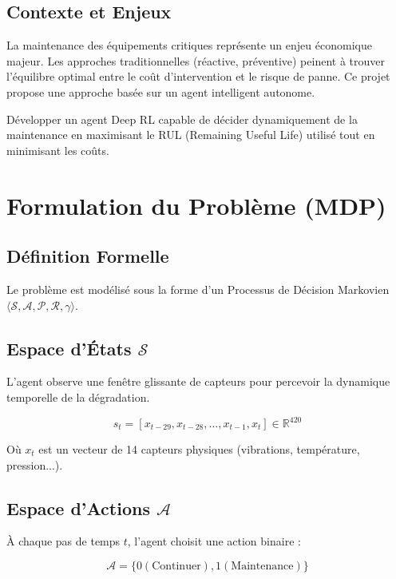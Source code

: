 \documentclass[11pt,a4paper]{report}
\begin{document}
\section{Contexte et Enjeux}
La maintenance des équipements critiques représente un enjeu économique majeur. Les approches traditionnelles (réactive, préventive) peinent à trouver l'équilibre optimal entre le coût d'intervention et le risque de panne.
Ce projet propose une approche basée sur un agent intelligent autonome.

\begin{infobox}
Développer un agent Deep RL capable de décider dynamiquement de la maintenance en maximisant le RUL (Remaining Useful Life) utilisé tout en minimisant les coûts.
\end{infobox}

\chapter{Formulation du Problème (MDP)}

\section{Définition Formelle}
Le problème est modélisé sous la forme d'un Processus de Décision Markovien $ \langle \mathcal{S}, \mathcal{A}, \mathcal{P}, \mathcal{R}, \gamma \rangle $.

\section{Espace d'États $\mathcal{S}$}
L'agent observe une fenêtre glissante de capteurs pour percevoir la dynamique temporelle de la dégradation.
\begin{eqbox}
\[ s_t = [x_{t-29}, x_{t-28}, \ldots, x_{t-1}, x_t] \in \mathbb{R}^{420} \]
\end{eqbox}
Où $x_t$ est un vecteur de 14 capteurs physiques (vibrations, température, pression...).

\section{Espace d'Actions $\mathcal{A}$}
À chaque pas de temps $t$, l'agent choisit une action binaire :
\begin{eqbox}
\[ \mathcal{A} = \{0 (\text{Continuer}), 1 (\text{Maintenance})\} \]
\end{eqbox}
\end{document}

